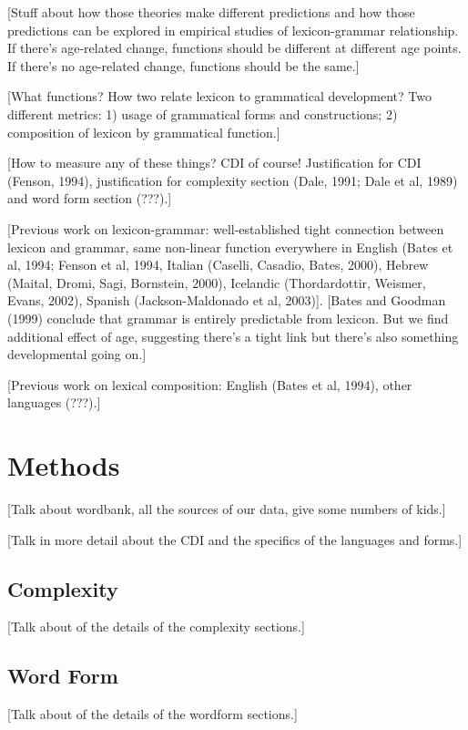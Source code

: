\documentclass[10pt,letterpaper]{article}
\begin{document}
[Stuff about how those theories make different predictions and how those predictions can be explored in empirical studies of lexicon-grammar relationship. If there's age-related change, functions should be different at different age points. If there's no age-related change, functions should be the same.]

[What functions? How two relate lexicon to grammatical development? Two different metrics: 1) usage of grammatical forms and constructions; 2) composition of lexicon by grammatical function.]

[How to measure any of these things? CDI of course! Justification for CDI (Fenson, 1994), justification for complexity section (Dale, 1991; Dale et al, 1989) and word form section (???).]

[Previous work on lexicon-grammar: well-established tight connection between lexicon and grammar, same non-linear function everywhere in English (Bates et al, 1994; Fenson et al, 1994, Italian (Caselli, Casadio, Bates, 2000), Hebrew (Maital, Dromi, Sagi, Bornstein, 2000), Icelandic (Thordardottir, Weismer, Evans, 2002), Spanish (Jackson-Maldonado et al, 2003)]. [Bates and Goodman (1999) conclude that grammar is entirely predictable from lexicon. But we find additional effect of age, suggesting there's a tight link but there's also something developmental going on.]

[Previous work on lexical composition: English (Bates et al, 1994), other languages (???).]

\clearpage

\section{Methods}

[Talk about wordbank, all the sources of our data, give some numbers of kids.]

[Talk in more detail about the CDI and the specifics of the languages and forms.]

\subsection{Complexity}
[Talk about of the details of the complexity sections.]

\subsection{Word Form}
[Talk about of the details of the wordform sections.]
\end{document}
